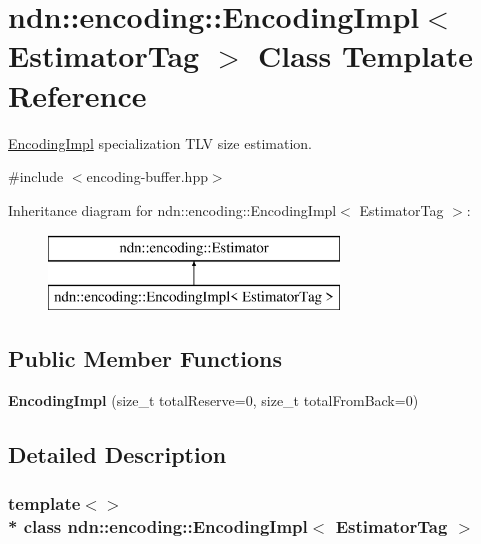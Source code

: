 \hypertarget{classndn_1_1encoding_1_1EncodingImpl_3_01EstimatorTag_01_4}{}\section{ndn\+:\+:encoding\+:\+:Encoding\+Impl$<$ Estimator\+Tag $>$ Class Template Reference}
\label{classndn_1_1encoding_1_1EncodingImpl_3_01EstimatorTag_01_4}


\hyperlink{classndn_1_1encoding_1_1EncodingImpl}{Encoding\+Impl} specialization T\+LV size estimation.  




{\ttfamily \#include $<$encoding-\/buffer.\+hpp$>$}

Inheritance diagram for ndn\+:\+:encoding\+:\+:Encoding\+Impl$<$ Estimator\+Tag $>$\+:\begin{figure}[H]
\begin{center}
\leavevmode
\includegraphics[height=2.000000cm]{classndn_1_1encoding_1_1EncodingImpl_3_01EstimatorTag_01_4}
\end{center}
\end{figure}
\subsection*{Public Member Functions}
\begin{DoxyCompactItemize}
\item 
{\bfseries Encoding\+Impl} (size\+\_\+t total\+Reserve=0, size\+\_\+t total\+From\+Back=0)\hypertarget{classndn_1_1encoding_1_1EncodingImpl_3_01EstimatorTag_01_4_aacb08ca1867fe5fdcd794f608f1f5b8c}{}\label{classndn_1_1encoding_1_1EncodingImpl_3_01EstimatorTag_01_4_aacb08ca1867fe5fdcd794f608f1f5b8c}

\end{DoxyCompactItemize}


\subsection{Detailed Description}
\subsubsection*{template$<$$>$\\*
class ndn\+::encoding\+::\+Encoding\+Impl$<$ Estimator\+Tag $>$}

